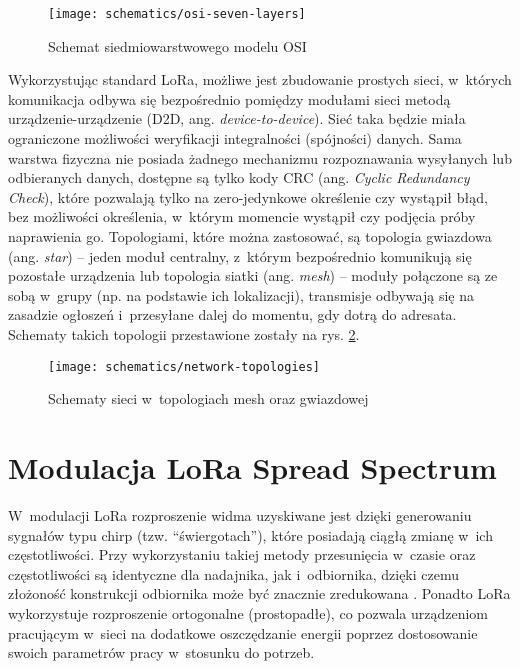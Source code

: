 \begin{figure}[!htbp]
    \centering
    \texttt{[image: schematics/osi-seven-layers]}
    \caption{\label{img:osi-seven-layer}Schemat siedmiowarstwowego modelu OSI}
\end{figure}

\FloatBarrier
Wykorzystując standard LoRa, możliwe jest zbudowanie prostych sieci, w~których komunikacja odbywa się bezpośrednio
pomiędzy modułami sieci metodą urządzenie-urządzenie (D2D, ang. \textsl{device-to-device}). Sieć taka będzie miała
ograniczone możliwości weryfikacji integralności (spójności) danych. Sama warstwa fizyczna nie posiada żadnego
mechanizmu rozpoznawania wysyłanych lub odbieranych danych, dostępne są tylko kody CRC (ang. \textsl{Cyclic Redundancy
    Check}), które pozwalają tylko na zero-jedynkowe określenie czy wystąpił błąd, bez możliwości określenia, w~którym
momencie wystąpił czy podjęcia próby naprawienia go. Topologiami, które można zastosować, są topologia gwiazdowa (ang.
\textsl{star}) -- jeden moduł centralny, z~którym bezpośrednio komunikują się pozostałe urządzenia lub topologia siatki
(ang. \textsl{mesh}) -- moduły połączone są ze sobą w~grupy (np. na podstawie ich lokalizacji), transmisje odbywają się
na zasadzie ogłoszeń i~przesyłane dalej do momentu, gdy dotrą do adresata. Schematy takich topologii przestawione
zostały na rys. \ref{img:network-topologies}.

\begin{figure}[!htbp]
    \centering
    \texttt{[image: schematics/network-topologies]}
    \caption{\label{img:network-topologies}Schematy sieci w~topologiach mesh oraz gwiazdowej}
\end{figure}

\FloatBarrier
\section{\label{sect:lora-modulation}Modulacja LoRa Spread Spectrum} W~modulacji LoRa rozproszenie widma uzyskiwane jest
dzięki generowaniu sygnałów typu chirp (tzw. \enquote{świergotach}), które posiadają ciągłą zmianę w~ich częstotliwości.
Przy wykorzystaniu takiej metody przesunięcia w~czasie oraz częstotliwości są identyczne dla nadajnika, jak
i~odbiornika, dzięki czemu złożoność konstrukcji odbiornika może być znacznie zredukowana \cite{lora-modulation-basics}.
Ponadto LoRa wykorzystuje rozproszenie ortogonalne (prostopadłe), co pozwala urządzeniom pracującym w~sieci na dodatkowe
oszczędzanie energii poprzez dostosowanie swoich parametrów pracy w~stosunku do potrzeb.

